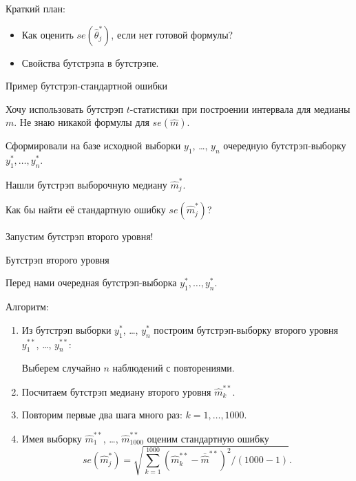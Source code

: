 
\begin{frame} %


\end{frame}



\begin{frame}{Краткий план:}
  \begin{itemize}[<+->]
    \item Как оценить $se(\hat \theta^*_j)$, если нет готовой формулы?
    \item Свойства бутстрэпа в бутстрэпе.
  \end{itemize}

\end{frame}


\begin{frame}{Пример бутстрэп-стандартной ошибки}

Хочу использовать бутстрэп $t$-статистики при построении интервала для медианы $m$.
Не знаю никакой формулы для $se(\hat m)$.

\pause Сформировали на базе исходной выборки $y_1$, \ldots, $y_n$ очередную бутстрэп-выборку 
$y^*_1, \ldots, y^*_n$.

Нашли бутстрэп выборочную медиану $\hat m^*_j$. 

Как бы найти её стандартную ошибку $se(\hat m^*_j)$?

\pause 
Запустим \alert{бутстрэп второго уровня}!

\end{frame}

\begin{frame}{Бутстрэп второго уровня}

Перед нами очередная бутстрэп-выборка $y^*_1, \ldots, y^*_n$.

\alert{Алгоритм:}

\begin{enumerate}[<+->]
  \item Из бутстрэп выборки $y^*_1$, \ldots, $y^*_n$ построим бутстрэп-выборку \alert{второго уровня} $y^{**}_1$, \ldots, $y^{**}_n$:

  Выберем случайно $n$ наблюдений с повторениями. 
  \item Посчитаем бутстрэп медиану второго уровня $\hat m^{**}_k$.
  \item Повторим первые два шага много раз: $k = 1, \ldots, 1000$.
  \item Имея выборку $\hat m^{**}_1$, \ldots, $\hat m^{**}_{1000}$ оценим стандартную ошибку
  \[
    se(\hat m^*_j) = \sqrt{\sum_{k=1}^{1000} (\hat m^{**}_k - \bar{\hat m}^{**})^2 / (1000 - 1)}.
  \]
\end{enumerate}



\end{frame}




